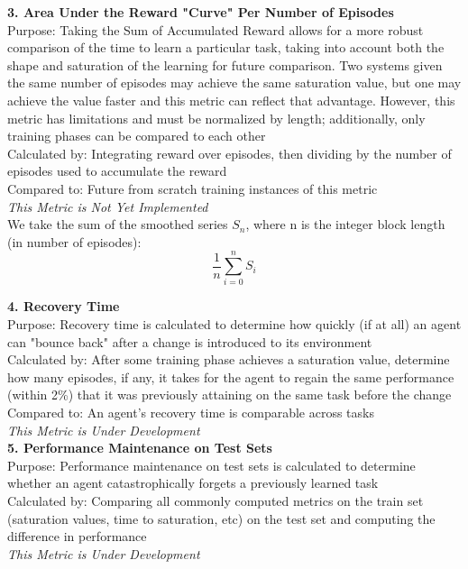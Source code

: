 \textbf{3. Area Under the Reward "Curve" Per Number of Episodes}\\
Purpose: Taking the Sum of Accumulated Reward allows for a more robust comparison of the time to learn a particular task, taking into account both the shape and saturation of the learning for future comparison. Two systems given the same number of episodes may achieve the same saturation value, but one may achieve the value faster and this metric can reflect that advantage. However,  this metric has limitations and must be normalized by length; additionally, only training phases can be compared to each other\\
Calculated by: Integrating reward over episodes, then dividing by the number of episodes used to accumulate the reward\\
Compared to: Future from scratch training instances of this metric\\
\textit{This Metric is Not Yet Implemented}\\[0.1in]

We take the sum of the smoothed series \begin{math}S_n\end{math}, where n is the integer block length (in number of episodes):\\[0.1in]

\[\frac{1}{n}\sum_{i=0}^{n} {S_i}\]

\textbf{4. Recovery Time}\\
Purpose: Recovery time is calculated to determine how quickly (if at all) an agent can "bounce back" after a change is introduced to its environment\\
Calculated by: After some training phase achieves a saturation value, determine how many episodes, if any, it takes for the agent to regain the same performance (within 2\%) that it was previously attaining on the same task before the change\\
Compared to: An agent's recovery time is comparable across tasks\\
\textit{This Metric is Under Development}\\[0.1in]

\textbf{5. Performance Maintenance on Test Sets}\\
Purpose: Performance maintenance on test sets is calculated to determine whether an agent catastrophically forgets a previously learned task\\
Calculated by: Comparing all commonly computed metrics on the train set (saturation values, time to saturation, etc) on the test set and computing the difference in performance\\
\textit{This Metric is Under Development}\\[0.1in]

